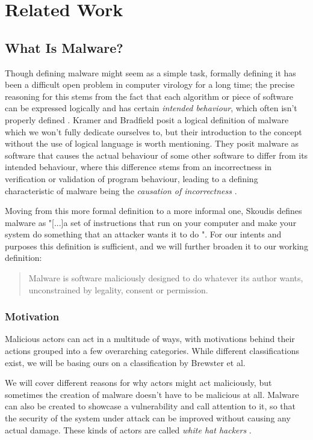 \chapter{Related Work}
\section{What Is Malware?}
Though defining malware might seem as a simple task, formally defining it has been a difficult open problem in 
computer virology for a long time; the precise reasoning for this stems from the fact that each algorithm or
piece of software can be expressed logically and has certain \emph{intended behaviour}, which often isn't
properly defined \cite{malware-definition}. Kramer and Bradfield posit a logical definition of malware which
we won't fully dedicate ourselves to, but their introduction to the concept without the use of logical language
is worth mentioning. They posit malware as software that causes the actual behaviour of some other software
to differ from its intended behaviour, where this difference stems from an incorrectness in verification or
validation of program behaviour, leading to a defining characteristic of malware being the \emph{causation of incorrectness}
\cite{malware-definition}. 

Moving from this more formal definition to a more informal one, Skoudis defines malware as "[...]a set of instructions that 
run on your computer and make your system do something that an attacker wants it to do \cite{malware-book}". For our
intents and purposes this definition is sufficient, and we will further broaden it to our working definition:
\begin{quote}
  Malware is software maliciously designed to do whatever its author wants, unconstrained by legality, consent or
  permission.
\end{quote}

\subsection{Motivation}
Malicious actors can act in a multitude of ways, with motivations behind their actions grouped into a few overarching
categories. While different classifications exist, we will be basing ours on a classification by Brewster et al.


We will cover different reasons for why actors might act maliciously, but sometimes the creation of malware doesn't have
to be malicious at all. Malware can also be created to showcase a vulnerability and call attention to it, so that the 
security of the system  under attack can be improved without causing any actual damage. These kinds of actors are 
called \emph{white hat hackers} \cite{white-hat-hacking-definition}.


